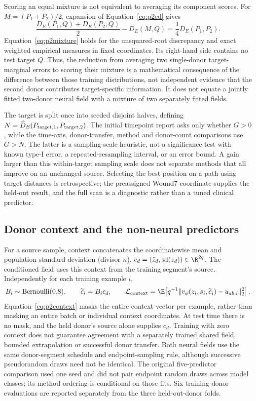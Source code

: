 \documentclass[10pt,a4paper]{article}
\begin{document}
Scoring an equal mixture is not equivalent to averaging its component scores. For $M=(P_1+P_2)/2$, expansion of Equation~\eqref{eq:p2ed} gives
\begin{equation}
\frac{D_E(P_1,Q)+D_E(P_2,Q)}{2}-D_E(M,Q)=\frac14D_E(P_1,P_2).\label{eq:p2mixture}
\end{equation}
Equation~\eqref{eq:p2mixture} holds for the unsquared-root discrepancy and exact weighted empirical measures in fixed coordinates. Its right-hand side contains no test target $Q$. Thus, the reduction from averaging two single-donor target-marginal errors to scoring their mixture is a mathematical consequence of the difference between those training distributions, not independent evidence that the second donor contributes target-specific information. It does not equate a jointly fitted two-donor neural field with a mixture of two separately fitted fields.

The target is split once into seeded disjoint halves, defining $N=\widehat D_E(P_{\rm target,1},P_{\rm target,2})$. The initial timepoint report asks only whether $G>0$, while the time-axis, donor-transfer, method and donor-count comparisons use $G>N$. The latter is a sampling-scale heuristic, not a significance test with known type-I error, a repeated-resampling interval, or an error bound. A gain larger than this within-target sampling scale does not separate methods that all improve on an unchanged source. Selecting the best position on a path using target distances is retrospective; the preassigned Wound7 coordinate supplies the held-out result, and the full scan is a diagnostic rather than a tuned clinical predictor.

\subsection{Donor context and the non-neural predictors}
For a source sample, context concatenates the coordinatewise mean and population standard deviation (divisor $n$), $c_d=(\bar z_d,\operatorname{sd}(z_d))\in\R^{2q}$. The conditioned field uses this context from the training segment's source. Independently for each training example $i$,
\begin{equation}
B_i\sim\operatorname{Bernoulli}(0.8),\qquad \widetilde c_i=B_i c_d,\qquad
\mathcal L_{\rm context}=\E\!\left[q^{-1}\|v_\phi(z_i,s_i,\widetilde c_i)-u_{ab,i}\|_2^2\right].\label{eq:p2context}
\end{equation}
Equation~\eqref{eq:p2context} masks the entire context vector per example, rather than masking an entire batch or individual context coordinates. At test time there is no mask, and the held donor's source alone supplies $c_d$. Training with zero context does not guarantee agreement with a separately trained shared field, bounded extrapolation or successful donor transfer. Both neural fields use the same donor-segment schedule and endpoint-sampling rule, although successive pseudorandom draws need not be identical. The original five-predictor comparison used one seed and did not pair endpoint random draws across model classes; its method ordering is conditional on those fits. Six training-donor evaluations are reported separately from the three held-out-donor folds.
\end{document}
